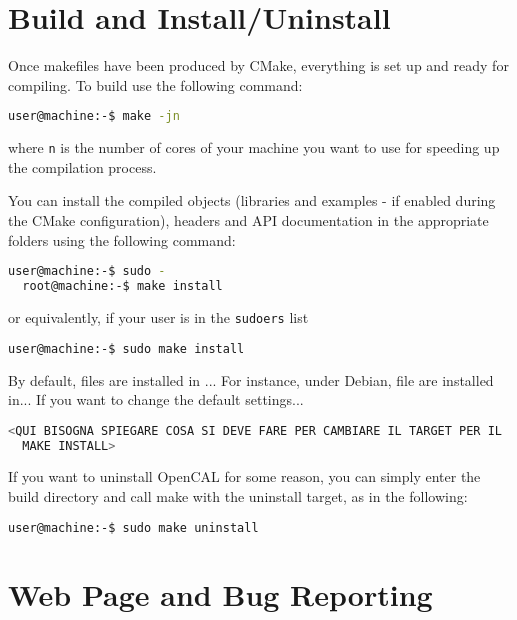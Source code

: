\section{Build and Install/Uninstall}
Once makefiles have been produced by CMake, everything is set up and
ready for compiling. To build use the following command:

\begin{lstlisting}[numbers=none,language=bash,label={ch:quickstart:ebuild}]
  user@machine:-$ make -jn
\end{lstlisting}
where \verb'n' is the number of cores of your machine you want to use
for speeding up the compilation process.

You can install the compiled objects (libraries and examples - if
enabled during the CMake configuration), headers and API documentation
in the appropriate folders using the following command:

\begin{lstlisting}[numbers=none,language=bash,label={ch:quickstart:install}]
  user@machine:-$ sudo - 
  root@machine:-$ make install
\end{lstlisting}

or equivalently, if your user is in the \texttt{sudoers} list

\begin{lstlisting}[numbers=none,language=bash,label={ch:quickstart:sudoinstall}]
  user@machine:-$ sudo make install
\end{lstlisting}

By default, files are installed in ... For instance, under Debian,
file are installed in... If you want to change the default settings...

\begin{lstlisting}[numbers=none,language=bash,label={ch:quickstart:sudoinstall}]
  <QUI BISOGNA SPIEGARE COSA SI DEVE FARE PER CAMBIARE IL TARGET PER IL
  MAKE INSTALL>
\end{lstlisting}

If you want to uninstall OpenCAL for some reason, you can simply enter the build directory and call make with the uninstall target, as in the following:

\begin{lstlisting}[numbers=none,language=bash,label={ch:quickstart:sudouninstall}]
  user@machine:-$ sudo make uninstall
\end{lstlisting}

\section{Web Page and Bug Reporting}

